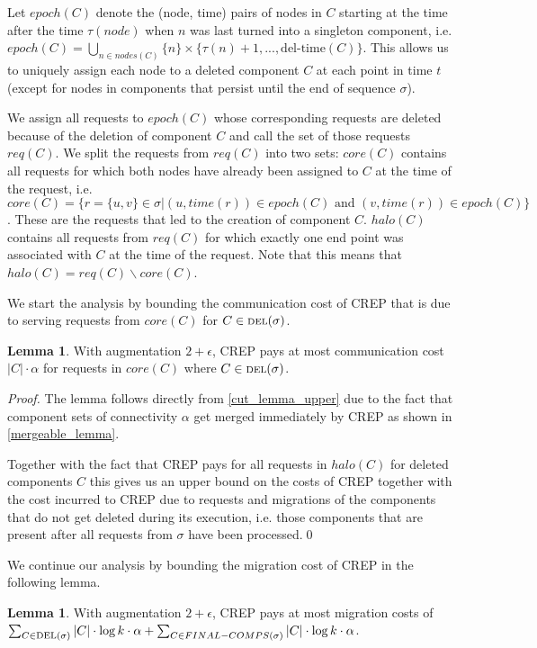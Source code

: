 \documentclass[xcolor=dvipsnames, tikz, 12pt]{article}
\newcommand{\nl}{\newline}
\newcommand{\crep}{C{\scriptsize REP}}
\newcommand{\del}{\text{\scriptsize DEL}}
\theoremstyle{definition}
\newtheorem{lemma}[defi]{Lemma}
\begin{document}
Let $epoch(C)$ denote the (node, time) pairs of nodes in $C$ starting at the time after the time $\tau(node)$ when $n$ was last turned into a singleton component, i.e. $epoch(C)=\bigcup_{n\in nodes(C)}\{n\}\times\{\tau(n)+1,...,\text{del-time}(C)\}$. This allows us to uniquely assign each node to a deleted component $C$ at each point in time $t$ (except for nodes in components that persist until the end of sequence $\sigma$).

We assign all requests to $epoch(C)$ whose corresponding requests are deleted because of the deletion of component $C$ and call the set of those requests $req(C)$.
We split the requests from $req(C)$ into two sets: $core(C)$ contains all requests for which both nodes have already been assigned to $C$ at the time of the request, i.e. $core(C)=\{r=\{u,v\}\in\sigma| (u,time(r))\in epoch(C)\text{ and } (v, time(r))\in epoch(C)\}$. These are the requests that led to the creation of component $C$. 
$halo(C)$ contains all requests from $req(C)$ for which exactly one end point was associated with $C$ at the time of the request. Note that this means that $halo(C)=req(C)\backslash core(C)$.

We start the analysis by bounding the communication cost of \crep{} that is due to serving requests from $core(C)$ for $C\in\del{}(\sigma)$.

\begin{lemma}
	\label{core_comm_upper}
	With augmentation $2+\epsilon$, \crep{} pays at most communication cost $|C|\cdot\alpha$ for requests in $core(C)$ where $C\in\del{}(\sigma)$.
\end{lemma}

\textit{Proof.} The lemma follows directly from \cref{cut_lemma_upper} due to the fact that component sets of connectivity $\alpha$ get merged immediately by \crep{} as shown in \cref{mergeable_lemma}.\nl

Together with the fact that \crep{} pays for all requests in $halo(C)$ for deleted components $C$ this gives us  an upper bound on the costs of \crep{} together with the cost incurred to \crep{} due to requests and migrations of the components that do not get deleted during its execution, i.e. those components that are present after all requests from $\sigma$ have been processed.\qed\nl

We continue our analysis by bounding the migration cost of \crep{} in the following lemma.
\begin{lemma}
	With augmentation $2+\epsilon$, \crep{} pays at most migration costs of $\sum_{C\in\del{}(\sigma)}|C|\cdot\log k\cdot\alpha+\sum_{C\in FINAL-COMPS(\sigma)}|C|\cdot\log k\cdot\alpha$.
\end{lemma}
\end{document}
